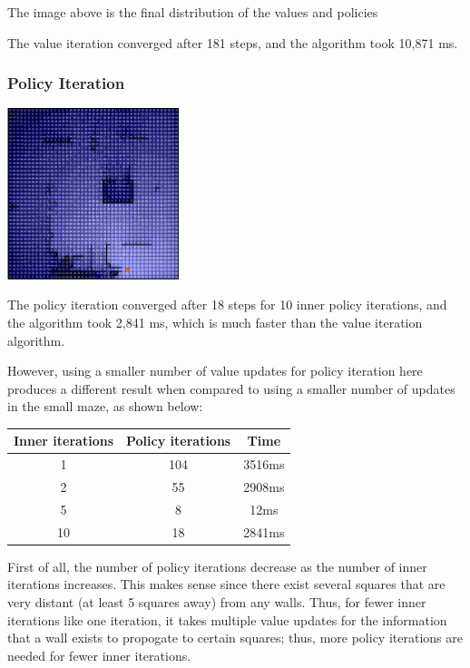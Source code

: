 \documentclass[11pt]{article}
\begin{document}
            The image above is the final
            distribution of the values and policies

            The value iteration converged after 181 steps, and the algorithm
            took 10,871 ms.

            \subsubsection{Policy Iteration}

            \includegraphics[width=5cm]{../images/large/pi.PNG}

            The policy iteration converged after 18 steps for 10 inner
            policy iterations, and the algorithm
            took 2,841 ms, which is much faster than the value iteration algorithm.

            However, using a smaller number of value updates for policy iteration here produces
            a different result when compared to using a smaller number of updates in the
            small maze, as shown below:

            \begin{tabular}{c c c}
                Inner iterations & Policy iterations & Time \\ \hline
                1 & 104 & 3516ms \\ \hline
                2 & 55 & 2908ms \\ \hline
                5 & 8 & 12ms \\ \hline
                10 & 18 & 2841ms \\ \hline

            \end{tabular}

            First of all, the number of policy iterations decrease as the number of inner iterations
            increases. This makes sense since there exist several squares that are very distant
            (at least 5 squares away) from any walls. Thus, for fewer inner iterations like one iteration,
            it takes multiple value updates for the information that a wall exists to propogate to certain
            squares; thus, more policy iterations are needed for fewer inner iterations.
\end{document}
